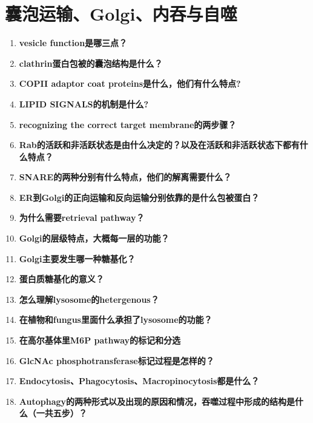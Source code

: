 \documentclass[12pt,fontset=none]{ctexart}
\begin{document}
\section*{囊泡运输、Golgi、内吞与自噬}
\begin{enumerate}
\item \textbf{vesicle function是哪三点？}

\item \textbf{clathrin蛋白包被的囊泡结构是什么？}

\item \textbf{COPII adaptor coat proteins是什么，他们有什么特点?}

\item \textbf{LIPID SIGNALS的机制是什么?}

\item \textbf{recognizing the correct target membrane的两步骤？}

\item \textbf{Rab的活跃和非活跃状态是由什么决定的？以及在活跃和非活跃状态下都有什么特点？}

\item \textbf{SNARE的两种分别有什么特点，他们的解离需要什么？}

\item \textbf{ER到Golgi的正向运输和反向运输分别依靠的是什么包被蛋白？}

\item \textbf{为什么需要retrieval pathway？}

\item \textbf{Golgi的层级特点，大概每一层的功能？}

\item \textbf{Golgi主要发生哪一种糖基化？}

\item \textbf{蛋白质糖基化的意义？}

\item \textbf{怎么理解lysosome的hetergenous？}

\item \textbf{在植物和fungus里面什么承担了lysosome的功能？}

\item \textbf{在高尔基体里M6P pathway的标记和分选}

\item \textbf{GlcNAc phosphotransferase标记过程是怎样的？}

\item \textbf{Endocytosis、Phagocytosis、Macropinocytosis都是什么？}

\item \textbf{Autophagy的两种形式以及出现的原因和情况，吞噬过程中形成的结构是什么（一共五步）？}

\end{enumerate}
\end{document}

